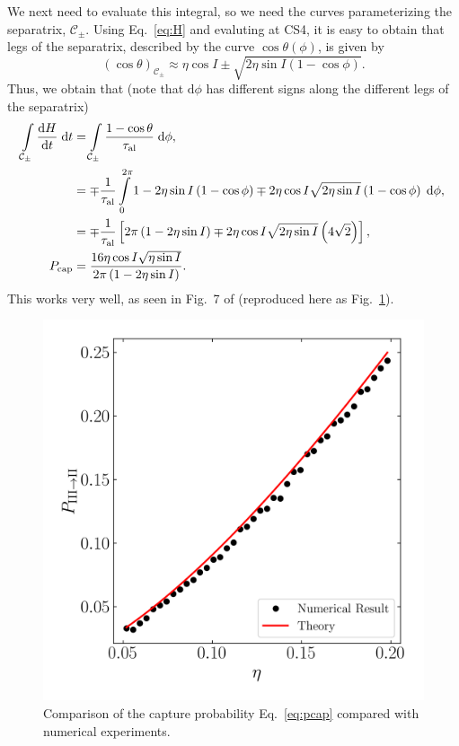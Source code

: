 \documentclass[11pt,
        usenames, %
        dvipsnames %
    ]{article}
\newcommand*{\rd}[2]{\frac{\mathrm{d}#1}{\mathrm{d}#2}}
\newcommand*{\p}[1]{\left(#1\right)}
\newcommand*{\s}[1]{\left[#1\right]}
\begin{document}
We next need to evaluate this integral, so we need the curves parameterizing the
separatrix, $\mathcal{C}_{\pm}$. Using Eq.~\eqref{eq:H} and evaluting at CS4, it
is easy to obtain that legs of the separatrix, described by the curve
$\cos\theta(\phi)$, is given by
\begin{equation}
    \p{\cos\theta}_{\mathcal{C}_{\pm}}
        \approx \eta \cos I \pm \sqrt{2\eta \sin I\p{1 - \cos\phi}}.
\end{equation}
Thus, we obtain that (note that $\mathrm{d}\phi$ has different signs along the
different legs of the separatrix)
\begin{align}
    \int\limits_{\mathcal{C}_{\pm}}
            \rd{H}{t}\;\mathrm{d}t
        &= \int\limits_{\mathcal{C}_{\pm}}
            \frac{1 - \cos\theta}{\tau_{\rm al}}\;\mathrm{d}\phi,\\
        &= \mp \frac{1}{\tau_{\rm al}}
            \int\limits_0^{2\pi}
                1 - 2\eta \sin I\p{1 - \cos \phi}
                    \mp 2\eta \cos I\sqrt{2\eta \sin I}\p{1 - \cos
                    \phi}\;\mathrm{d}\phi,\\
        &= \mp \frac{1}{\tau_{\rm al}}
            \s{2\pi\p{1 - 2\eta \sin I}
                \mp 2\eta \cos I\sqrt{2\eta \sin I}\p{4\sqrt{2}}},\\
    P_{\rm cap}
        &= \frac{16\eta\cos I\sqrt{\eta \sin I}}{
            2\pi\p{1 - 2\eta \sin I}}.\label{eq:pcap}
\end{align}
This works very well, as seen in Fig.~7 of \citet{su2022dynamics} (reproduced
here as Fig.~\ref{fig:pcap}).
\begin{figure}
    \centering
    \includegraphics[width=0.5\columnwidth]{1hist_toy.png}
    \caption{Comparison of the capture probability Eq.~\eqref{eq:pcap}
    compared with numerical experiments.}\label{fig:pcap}
\end{figure}
\end{document}
